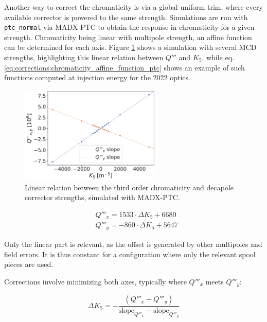 Another way to correct the chromaticity is via a global uniform trim, where every available corrector is powered to the same strength.
  Simulations are run with \verb|ptc_normal| via MADX-PTC to obtain the response in chromaticity for a given strength. Chromaticity being linear with multipole strength, an affine function can be determined for each axis. Figure \ref{fig:corrections-dq3_versus_k5} shows a simulation with several MCD strengths, highlighting this linear relation between $Q'''$ and $K_5$, while eq.\ref{eq:corrections:chromaticity_affine_function_ptc} shows an example of such functions computed at injection energy for the 2022 optics.

\begin{figure}[H]
  \centering
  \includegraphics[width=0.6\textwidth]{images/dq3_k5.pdf}
  \caption{Linear relation between the third order chromaticity and decapole corrector strengths, simulated with MADX-PTC.}
  \label{fig:corrections-dq3_versus_k5}
\end{figure}

\begin{equation}
  \begin{aligned}
    &Q'''_x = 1533 \cdot \Delta K_5 + 6680 \\
    &Q'''_y = -860 \cdot \Delta K_5 + 5647
  \end{aligned}
  \label{eq:corrections:chromaticity_affine_function_ptc}
\end{equation}

Only the linear part is relevant, as the offset is generated by other multipoles and field errors. It is thus constant for a configuration where only the relevant spool pieces are used.

Corrections involve minimizing both axes, typically where $Q'''_x$ meets $Q'''_y$:

\begin{equation}
  \Delta K_5 = -\frac{(Q'''_x - Q'''_y)}{\text{slope}_{Q'''_x} - \text{slope}_{Q'''_y}}
  \label{eq:corrections:chromaticity_global_correction}
\end{equation}
